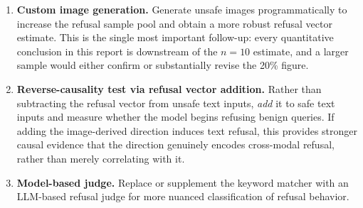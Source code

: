 \documentclass[11pt]{article}
\begin{document}
\begin{enumerate}[nosep]
    \item \textbf{Custom image generation.} Generate unsafe images programmatically to increase the refusal sample pool and obtain a more robust refusal vector estimate. This is the single most important follow-up: every quantitative conclusion in this report is downstream of the $n = 10$ estimate, and a larger sample would either confirm or substantially revise the 20\% figure.
    \item \textbf{Reverse-causality test via refusal vector addition.} Rather than subtracting the refusal vector from unsafe text inputs, \textit{add} it to safe text inputs and measure whether the model begins refusing benign queries. If adding the image-derived direction induces text refusal, this provides stronger causal evidence that the direction genuinely encodes cross-modal refusal, rather than merely correlating with it.
    \item \textbf{Model-based judge.} Replace or supplement the keyword matcher with an LLM-based refusal judge for more nuanced classification of refusal behavior.
\end{enumerate}
\end{document}
